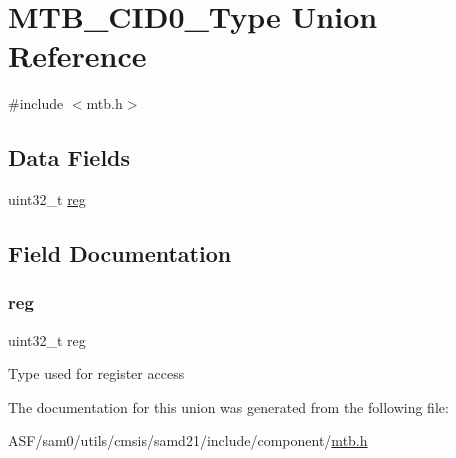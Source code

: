 \hypertarget{union_m_t_b___c_i_d0___type}{}\section{M\+T\+B\+\_\+\+C\+I\+D0\+\_\+\+Type Union Reference}
\label{union_m_t_b___c_i_d0___type}


{\ttfamily \#include $<$mtb.\+h$>$}

\subsection*{Data Fields}
\begin{DoxyCompactItemize}
\item 
uint32\+\_\+t \mbox{\hyperlink{union_m_t_b___c_i_d0___type_a6b91636401516a477989a336376d7b40}{reg}}
\end{DoxyCompactItemize}


\subsection{Field Documentation}
\mbox{\label{union_m_t_b___c_i_d0___type_a6b91636401516a477989a336376d7b40}} 
\subsubsection{\texorpdfstring{reg}{reg}}
{\footnotesize\ttfamily uint32\+\_\+t reg}

Type used for register access 

The documentation for this union was generated from the following file\+:\begin{DoxyCompactItemize}
\item 
A\+S\+F/sam0/utils/cmsis/samd21/include/component/\mbox{\hyperlink{component_2mtb_8h}{mtb.\+h}}\end{DoxyCompactItemize}

